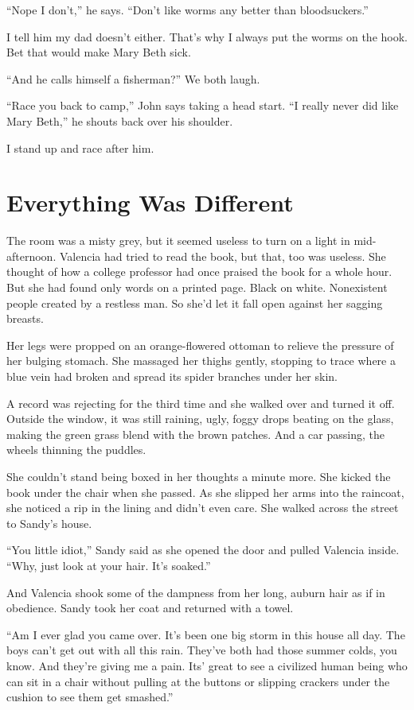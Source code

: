 \documentclass[twoside,10pt]{book}
\begin{document}
``Nope I don't,'' he says. ``Don't like worms any better than
bloodsuckers.''

I tell him my dad doesn't either. That's why I always put the worms on
the hook. Bet that would make Mary Beth sick.

``And he calls himself a fisherman?'' We both laugh.

\clearpage
``Race you back to camp,'' John says taking a head start. ``I really
never did like Mary Beth,'' he shouts back over his shoulder.

I stand up and race after him.



\cleardoublepage
\chapter{Everything Was Different}

The room was a misty grey, but it seemed useless to turn on a light in
mid-afternoon. Valencia had tried to read the book, but that, too was
useless. She thought of how a college professor had once praised the
book for a whole hour. But she had found only words on a printed page.
Black on white. Nonexistent people created by a restless man. So she'd
let it fall open against her sagging breasts.

Her legs were propped on an orange-flowered ottoman to relieve the
pressure of her bulging stomach. She massaged her thighs gently,
stopping to trace where a blue vein had broken and spread its spider
branches under her skin.

A record was rejecting for the third time and she walked over and turned
it off. Outside the window, it was still raining, ugly, foggy drops
beating on the glass, making the green grass blend with the brown
patches. And a car passing, the wheels thinning the puddles.

She couldn't stand being boxed in her thoughts a minute more. She kicked
the book under the chair when she passed. As she slipped her arms into
the raincoat, she noticed a rip in the lining and didn't even care. She
walked across the street to Sandy's house.

``You little idiot,'' Sandy said as she opened the door and pulled
Valencia inside. ``Why, just look at your hair. It's soaked.''

And Valencia shook some of the dampness from her long, auburn hair as if
in obedience. Sandy took her coat and returned with a towel.

``Am I ever glad you came over. It's been one big storm in this house
all day. The boys can't get out with all this rain. They've both had
those summer colds, you know. And they're giving me a pain. Its' great
to see a civilized human being who can sit in a chair without pulling at
the buttons or slipping crackers under the cushion to see them get
smashed.''
\end{document}
